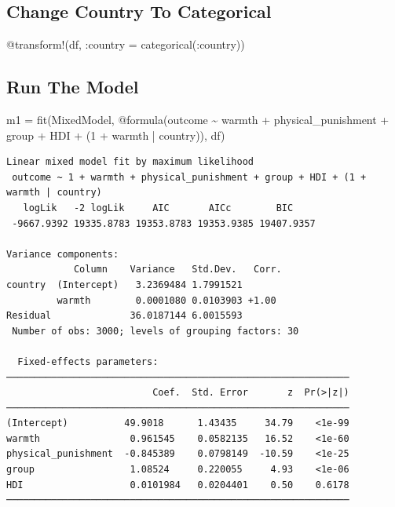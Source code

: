\documentclass[
  letterpaper,
  DIV=11,
  numbers=noendperiod]{scrreprt}
\newenvironment{Shaded}{\begin{snugshade}}{\end{snugshade}}
\newcommand{\FloatTok}[1]{\textcolor[rgb]{0.68,0.00,0.00}{#1}}
\newcommand{\FunctionTok}[1]{\textcolor[rgb]{0.28,0.35,0.67}{#1}}
\newcommand{\NormalTok}[1]{\textcolor[rgb]{0.00,0.23,0.31}{#1}}
\newcommand{\OperatorTok}[1]{\textcolor[rgb]{0.37,0.37,0.37}{#1}}
\newcommand{\PreprocessorTok}[1]{\textcolor[rgb]{0.68,0.00,0.00}{#1}}
\begin{document}
\subsection{Change Country To
Categorical}\label{change-country-to-categorical}

\begin{Shaded}
\begin{Highlighting}[]
\PreprocessorTok{@transform}\NormalTok{!(df, }\OperatorTok{:}\NormalTok{country }\OperatorTok{=} \FunctionTok{categorical}\NormalTok{(}\OperatorTok{:}\NormalTok{country))}
\end{Highlighting}
\end{Shaded}

\subsection{Run The Model}\label{run-the-model-2}

\begin{Shaded}
\begin{Highlighting}[]

\NormalTok{m1 }\OperatorTok{=} \FunctionTok{fit}\NormalTok{(MixedModel, }\PreprocessorTok{@formula}\NormalTok{(outcome }\OperatorTok{\textasciitilde{}}\NormalTok{ warmth }\OperatorTok{+}\NormalTok{ physical\_punishment }\OperatorTok{+} 
\NormalTok{               group }\OperatorTok{+}\NormalTok{ HDI }\OperatorTok{+}
\NormalTok{               (}\FloatTok{1} \OperatorTok{+}\NormalTok{ warmth }\OperatorTok{|}\NormalTok{ country)), df)}
\end{Highlighting}
\end{Shaded}

\begin{verbatim}
Linear mixed model fit by maximum likelihood
 outcome ~ 1 + warmth + physical_punishment + group + HDI + (1 + warmth | country)
   logLik   -2 logLik     AIC       AICc        BIC    
 -9667.9392 19335.8783 19353.8783 19353.9385 19407.9357

Variance components:
            Column    Variance   Std.Dev.   Corr.
country  (Intercept)   3.2369484 1.7991521
         warmth        0.0001080 0.0103903 +1.00
Residual              36.0187144 6.0015593
 Number of obs: 3000; levels of grouping factors: 30

  Fixed-effects parameters:
─────────────────────────────────────────────────────────────
                          Coef.  Std. Error       z  Pr(>|z|)
─────────────────────────────────────────────────────────────
(Intercept)          49.9018      1.43435     34.79    <1e-99
warmth                0.961545    0.0582135   16.52    <1e-60
physical_punishment  -0.845389    0.0798149  -10.59    <1e-25
group                 1.08524     0.220055     4.93    <1e-06
HDI                   0.0101984   0.0204401    0.50    0.6178
─────────────────────────────────────────────────────────────
\end{verbatim}
\end{document}
